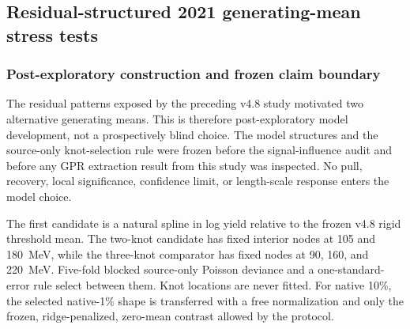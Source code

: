 
\subsection{Residual-structured 2021 generating-mean stress tests}
\label{sec:v4p8p3-residual-functional-forms}

\begin{center}
\end{center}

\subsubsection{Post-exploratory construction and frozen claim boundary}

The residual patterns exposed by the preceding v4.8 study motivated two
alternative generating means.  This is therefore post-exploratory model
development, not a prospectively blind choice.  The model structures and the
source-only knot-selection rule were frozen before the signal-influence audit
and before any GPR extraction result from this study was inspected.  No pull,
recovery, local significance, confidence limit, or length-scale response enters
the model choice.

The first candidate is a natural spline in log yield relative to the frozen
v4.8 rigid threshold mean.  The two-knot candidate has fixed interior nodes at
105 and 180~MeV, while the three-knot comparator has fixed nodes at 90, 160,
and 220~MeV.  Five-fold blocked source-only Poisson deviance and a
one-standard-error rule select between them.  Knot locations are never fitted.
For native 10\%, the selected native-1\% shape is transferred with a free
normalization and only the frozen, ridge-penalized, zero-mean contrast allowed
by the protocol.

